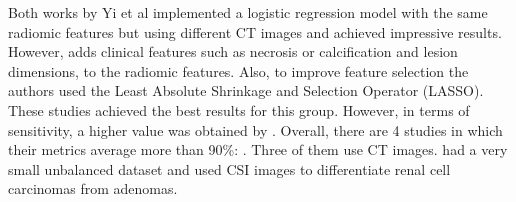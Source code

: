 \documentclass[11pt]{article}
\begin{document}
Both works by Yi et al \cite{Yi2018, Yi20181} implemented a logistic regression
model with the same radiomic features but using different CT images and achieved
impressive results. However, \cite{Yi2018} adds clinical features such as
necrosis or calcification and lesion dimensions, to the radiomic features. Also,
to improve feature selection the authors used the Least Absolute Shrinkage and
Selection Operator (LASSO). These studies achieved the best results for this
group. However, in terms of sensitivity, a higher
value was obtained by \cite{Yi2018}. Overall, there are 4 studies in which their metrics average more than
90\%: \cite{Yi2018, Yi20181, Kusunoki2022, Schieda2017}. Three of them use CT
images. \cite{Schieda2017} had a very small unbalanced dataset and used CSI
images to differentiate renal cell carcinomas from adenomas.
\end{document}
